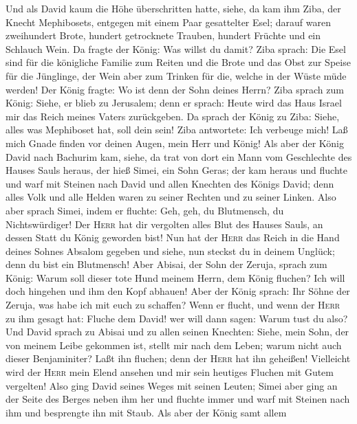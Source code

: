  Und als David kaum die Höhe überschritten hatte, siehe,
da kam ihm Ziba, der Knecht Mephibosets, entgegen mit einem Paar
gesattelter Esel; darauf waren zweihundert Brote, hundert getrocknete
Trauben, hundert Früchte und ein Schlauch Wein.  Da fragte
der König: Was willst du damit? Ziba sprach: Die Esel sind für die
königliche Familie zum Reiten und die Brote und das Obst zur Speise für
die Jünglinge, der Wein aber zum Trinken für die, welche in der Wüste
müde werden!  Der König fragte: Wo ist denn der Sohn
deines Herrn? Ziba sprach zum König: Siehe, er blieb zu Jerusalem; denn
er sprach: Heute wird das Haus Israel mir das Reich meines Vaters
zurückgeben.  Da sprach der König zu Ziba: Siehe, alles
was Mephiboset hat, soll dein sein! Ziba antwortete: Ich verbeuge mich!
Laß mich Gnade finden vor deinen Augen, mein Herr und König!
 Als aber der König David nach Bachurim kam, siehe, da
trat von dort ein Mann vom Geschlechte des Hauses Sauls heraus, der hieß
Simei, ein Sohn Geras;  der kam heraus und fluchte und
warf mit Steinen nach David und allen Knechten des Königs David; denn
alles Volk und alle Helden waren zu seiner Rechten und zu seiner Linken.
 Also aber sprach Simei, indem er fluchte: Geh, geh, du
Blutmensch, du Nichtswürdiger!  Der \textsc{Herr} hat dir
vergolten alles Blut des Hauses Sauls, an dessen Statt du König geworden
bist! Nun hat der \textsc{Herr} das Reich in die Hand deines Sohnes
Absalom gegeben und siehe, nun steckst du in deinem Unglück; denn du
bist ein Blutmensch!  Aber Abisai, der Sohn der Zeruja,
sprach zum König: Warum soll dieser tote Hund meinem Herrn, dem König
fluchen? Ich will doch hingehen und ihm den Kopf abhauen!
 Aber der König sprach: Ihr Söhne der Zeruja, was habe
ich mit euch zu schaffen? Wenn er flucht, und wenn der \textsc{Herr} zu
ihm gesagt hat: Fluche dem David! wer will dann sagen: Warum tust du
also?  Und David sprach zu Abisai und zu allen seinen
Knechten: Siehe, mein Sohn, der von meinem Leibe gekommen ist, stellt
mir nach dem Leben; warum nicht auch dieser Benjaminiter? Laßt ihn
fluchen; denn der \textsc{Herr} hat ihn geheißen! 
Vielleicht wird der \textsc{Herr} mein Elend ansehen und mir sein
heutiges Fluchen mit Gutem vergelten!  Also ging David
seines Weges mit seinen Leuten; Simei aber ging an der Seite des Berges
neben ihm her und fluchte immer und warf mit Steinen nach ihm und
besprengte ihn mit Staub.  Als aber der König samt allem
